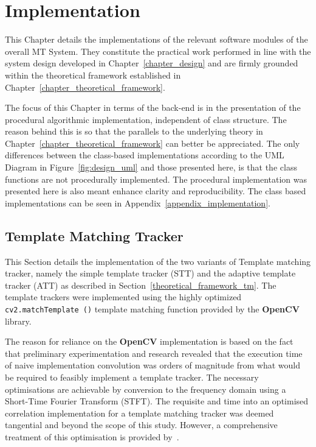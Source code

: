\chapter{Implementation}\label{chapter_implementation}
This Chapter details the implementations of the relevant software modules of the
overall MT System. They constitute the practical work performed in line with the system design
developed in Chapter~\ref{chapter_design} and are firmly grounded within the theoretical framework
established in Chapter~\ref{chapter_theoretical_framework}.

The focus of this Chapter in terms of the back-end is in the presentation of the
procedural algorithmic implementation, independent of class structure. The
reason behind this is so that the parallels to the underlying theory in
Chapter~\ref{chapter_theoretical_framework} can better be appreciated.
The only differences between the class-based implementations according to the
UML Diagram in Figure~\ref{fig:design_uml} and those presented here, is that the
class functions are not procedurally implemented. The procedural implementation
was presented here is also meant enhance clarity and reproducibility. The class based
implementations can be seen in Appendix~\ref{appendix_implementation}.

\section{Template Matching Tracker}\label{implementation_tm}
This Section details the implementation of the two variants of Template matching
tracker, namely the simple template tracker (STT) and the adaptive template
tracker (ATT) as described in Section~\ref{theoretical_framework_tm}. The template trackers were
implemented using the highly optimized \lstinline{cv2.matchTemplate ()} template
matching function provided by the \textbf{OpenCV} library.  

The reason for reliance on the \textbf{OpenCV} implementation is based on the fact that
preliminary experimentation and research revealed that the execution time of
naive implementation convolution was orders of magnitude from
what would be required to feasibly implement a template
tracker. 
The necessary optimisations are achievable by conversion to the frequency domain using a
Short-Time Fourier Transform (STFT). The requisite and time into an optimised
correlation implementation for a template matching tracker was deemed tangential
and beyond the scope of this study. However, a comprehensive treatment of this
optimisation is provided by~\cite{Usevitch2010}.

